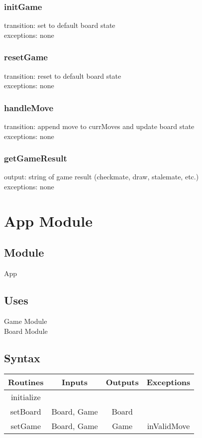 \documentclass{article}
\begin{document}
        \subsubsection*{initGame}
            transition: set to default board state \\ 
            exceptions: none
    
        \subsubsection*{resetGame}
            transition: reset to default board state \\
            exceptions: none
            
        \subsubsection*{handleMove}
            transition: append move to currMoves and update board state \\ 
            exceptions: none
        
        \subsubsection*{getGameResult}
            output: string of game result (checkmate, draw, stalemate, etc.) \\
            exceptions: none
            

\newpage
\section*{App Module}
    \subsection*{Module}
        App
    
    \subsection*{Uses}
        Game Module \\
        Board Module
    
    \subsection*{Syntax}
        \begin{center}
            \begin{tabular}{|c|c|c|c|} 
                \hline
                Routines & Inputs & Outputs & Exceptions \\
                \hline
                initialize & & &\\
                \hline
                setBoard & Board, Game & Board &  \\ 
                \hline
                setGame & Board, Game & Game & inValidMove \\
                \hline
            \end{tabular}
        \end{center}
    
\end{document}
